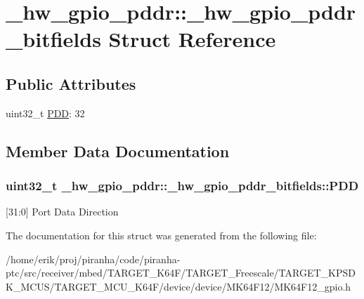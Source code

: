 \hypertarget{struct__hw__gpio__pddr_1_1__hw__gpio__pddr__bitfields}{}\section{\+\_\+hw\+\_\+gpio\+\_\+pddr\+:\+:\+\_\+hw\+\_\+gpio\+\_\+pddr\+\_\+bitfields Struct Reference}
\label{struct__hw__gpio__pddr_1_1__hw__gpio__pddr__bitfields}
\subsection*{Public Attributes}
\begin{DoxyCompactItemize}
\item 
uint32\+\_\+t \hyperlink{struct__hw__gpio__pddr_1_1__hw__gpio__pddr__bitfields_ab2d4ac1477c60f0198f900db69baeb4f}{P\+DD}\+: 32
\end{DoxyCompactItemize}


\subsection{Member Data Documentation}
\subsubsection[{\texorpdfstring{P\+DD}{PDD}}]{\setlength{\rightskip}{0pt plus 5cm}uint32\+\_\+t \+\_\+hw\+\_\+gpio\+\_\+pddr\+::\+\_\+hw\+\_\+gpio\+\_\+pddr\+\_\+bitfields\+::\+P\+DD}\hypertarget{struct__hw__gpio__pddr_1_1__hw__gpio__pddr__bitfields_ab2d4ac1477c60f0198f900db69baeb4f}{}\label{struct__hw__gpio__pddr_1_1__hw__gpio__pddr__bitfields_ab2d4ac1477c60f0198f900db69baeb4f}
\mbox{[}31\+:0\mbox{]} Port Data Direction 

The documentation for this struct was generated from the following file\+:\begin{DoxyCompactItemize}
\item 
/home/erik/proj/piranha/code/piranha-\/ptc/src/receiver/mbed/\+T\+A\+R\+G\+E\+T\+\_\+\+K64\+F/\+T\+A\+R\+G\+E\+T\+\_\+\+Freescale/\+T\+A\+R\+G\+E\+T\+\_\+\+K\+P\+S\+D\+K\+\_\+\+M\+C\+U\+S/\+T\+A\+R\+G\+E\+T\+\_\+\+M\+C\+U\+\_\+\+K64\+F/device/device/\+M\+K64\+F12/M\+K64\+F12\+\_\+gpio.\+h\end{DoxyCompactItemize}
